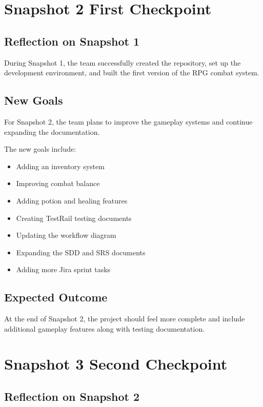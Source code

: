 \documentclass{article}
\begin{document}
\section{Snapshot 2 First Checkpoint}

\subsection{Reflection on Snapshot 1}

During Snapshot 1, the team successfully created the repository,
set up the development environment, and built the first version
of the RPG combat system.

\subsection{New Goals}

For Snapshot 2, the team plans to improve the gameplay systems
and continue expanding the documentation.

The new goals include:

\begin{itemize}
\item Adding an inventory system
\item Improving combat balance
\item Adding potion and healing features
\item Creating TestRail testing documents
\item Updating the workflow diagram
\item Expanding the SDD and SRS documents
\item Adding more Jira sprint tasks
\end{itemize}

\subsection{Expected Outcome}

At the end of Snapshot 2, the project should feel more complete
and include additional gameplay features along with testing documentation.

\section{Snapshot 3 Second Checkpoint}

\subsection{Reflection on Snapshot 2}
\end{document}
